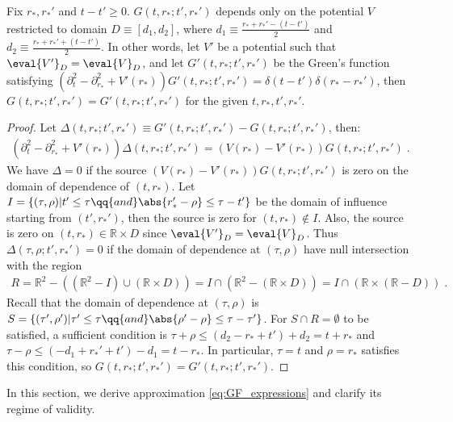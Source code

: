 \begin{theorem}
  Fix $r_*, r_*'$ and $t-t' \geq 0$.
  $G(t,r_*;t',r_*')$ depends only on the potential $V$ restricted to domain $D \equiv [d_1, d_2]$, where $d_1 \equiv \frac{r_*+r_*' - (t-t')}{2}$ and $d_2 \equiv \frac{r_*+r_*' + (t-t')}{2}$.
  In other words, let $V'$ be a potential such that $\eval{V'}_D = \eval{V}_D$, and let $G'(t,r_*;t',r_*')$ be the Green's function satisfying $(\partial_t^2 - \partial_{r_*}^2 + V'(r_*)) G'(t,r_*;t',r_*') =  \delta(t-t') \delta(r_*-r_*')$, then $G(t,r_*;t',r_*') = G'(t,r_*;t',r_*')$ for the given $t,r_*,t',r_*'$.
\end{theorem}
\begin{proof}
  Let $\Delta(t,r_*;t',r_*') \equiv G'(t,r_*;t',r_*') - G(t,r_*;t',r_*')$, then:
  \begin{align}
   (\partial_t^2 - \partial_{r_*}^2 + V'(r_*)) \Delta(t,r_*;t',r_*') = (V(r_*)  - V'(r_*)) G(t,r_*;t',r_*') \;.
  \end{align}
  We have $\Delta = 0$ if the source $ (V(r_*)  - V'(r_*)) G(t,r_*;t',r_*')$ is zero on the domain of dependence of $(t,r_*)$.
  Let $I = \{(\tau,\rho) | t' \leq \tau \qq{and} \abs{r_*' - \rho} \leq \tau - t'\}$ be the domain of influence starting from $(t',r_*')$, then the source is zero for $(t,r_*) \notin I$.
  Also, the source is zero on $(t,r_*) \in \mathbb{R} \times D$ since $\eval{V'}_D = \eval{V}_D$.
  Thus $\Delta(\tau,\rho;t',r_*') = 0$ if the domain of dependence at $(\tau,\rho)$ have null intersection with the region
  \begin{align}
    R = \mathbb{R}^2 - ((\mathbb{R}^2 - I) \cup (\mathbb{R} \times D))
    = I \cap (\mathbb{R}^2 - (\mathbb{R} \times D))
    = I \cap (\mathbb{R} \times (\mathbb{R} - D)) \;.
  \end{align}
  Recall that the domain of dependence at $(\tau,\rho)$ is $S = \{(\tau',\rho') | \tau' \leq \tau \qq{and} \abs{\rho' - \rho} \leq \tau - \tau'\}$.
  For $S \cap R = \emptyset$ to be satisfied, a sufficient condition is  $\tau + \rho \leq  (d_2 - r_* + t') + d_2 = t + r_*$ and $\tau - \rho \leq (-d_1 + r_*' + t')- d_1 = t - r_*$.
  In particular, $\tau = t$ and $\rho = r_*$ satisfies this condition, so $G(t,r_*;t',r_*') = G'(t,r_*;t',r_*')$.
\end{proof}




\label{sec:GF_approximation}
In this section, we derive approximation \eqref{eq:GF_expressions} and clarify its regime of validity.



